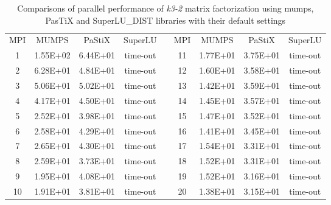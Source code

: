 \begin{table}[ht]
\centering
\begin{tabular}{|c|c|c|c|l|c|c|c|c|}
\cline{1-4} \cline{6-9}
MPI & MUMPS    & PaStiX   & SuperLU &  & MPI & MUMPS    & PaStiX   & SuperLU \\ \cline{1-4} \cline{6-9} 
1   & 1.55E+02 & 6.44E+01 & time-out &  & 11  & 1.77E+01 & 3.75E+01 & time-out \\ \cline{1-4} \cline{6-9} 
2   & 6.28E+01 & 4.84E+01 & time-out &  & 12  & 1.60E+01 & 3.58E+01 & time-out \\ \cline{1-4} \cline{6-9} 
3   & 5.06E+01 & 5.02E+01 & time-out &  & 13  & 1.42E+01 & 3.59E+01 & time-out \\ \cline{1-4} \cline{6-9} 
4   & 4.17E+01 & 4.50E+01 & time-out &  & 14  & 1.45E+01 & 3.57E+01 & time-out \\ \cline{1-4} \cline{6-9} 
5   & 2.52E+01 & 3.98E+01 & time-out &  & 15  & 1.47E+01 & 3.52E+01 & time-out \\ \cline{1-4} \cline{6-9} 
6   & 2.58E+01 & 4.29E+01 & time-out &  & 16  & 1.41E+01 & 3.45E+01 & time-out \\ \cline{1-4} \cline{6-9} 
7   & 2.65E+01 & 4.30E+01 & time-out &  & 17  & 1.54E+01 & 3.31E+01 & time-out \\ \cline{1-4} \cline{6-9} 
8   & 2.59E+01 & 3.73E+01 & time-out &  & 18  & 1.52E+01 & 3.31E+01 & time-out \\ \cline{1-4} \cline{6-9} 
9   & 1.95E+01 & 4.08E+01 & time-out &  & 19  & 1.52E+01 & 3.16E+01 & time-out \\ \cline{1-4} \cline{6-9} 
10  & 1.91E+01 & 3.81E+01 & time-out &  & 20  & 1.38E+01 & 3.15E+01 & time-out \\ \cline{1-4} \cline{6-9} 
\end{tabular}
\caption{Comparisons of parallel performance of  \textit{k3-2} matrix factorization using \acrshort{mumps}, PasTiX and SuperLU\_DIST libraries with their default settings}
\label{table:app-lc-k3-2-result}
\end{table}


